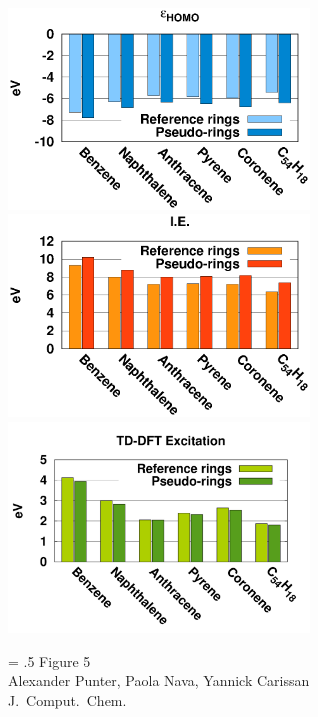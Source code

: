 \documentclass[12pt]{article}
\begin{document}
\begin{figure}
\begin{center}
\includegraphics[width=8cm]{ring_pbe0_homo_uhf}\\
\includegraphics[width=8cm]{ring_pbe0_ie_uhf}\\
\includegraphics[width=8cm]{ring_pbe0_tddft}\\
\end{center}
{\Large
\begin{minipage}[t]{3in}
\baselineskip = .5\baselineskip
Figure 5 \\
Alexander Punter, Paola Nava, Yannick Carissan\\
J.\ Comput.\ Chem.
\end{minipage}
}
\end{figure}
\end{document}

